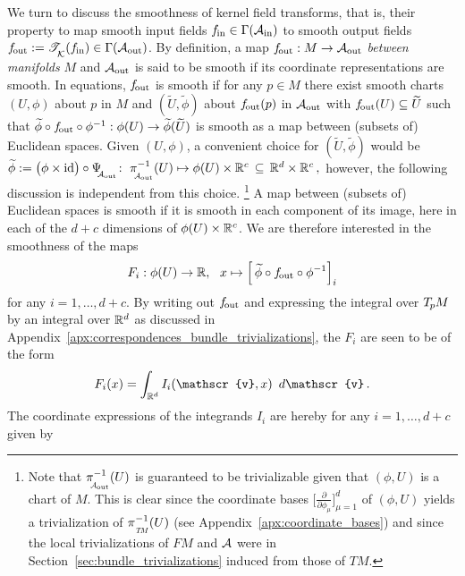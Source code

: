 We turn to discuss the smoothness of kernel field transforms, that is, their property to map smooth input fields $f_\textup{\;\!\!in}\in\Gamma(\mathcal{A}_\textup{in})$ to smooth output fields $f_\textup{\:\!\!out} := \mathscr{T}_{\overset{}{\mkern-0mu \mathcal{K}}}(f_\textup{\;\!\!in}) \in \Gamma(\mathcal{A}_\textup{out})$.
By definition, a map $f_\textup{\:\!\!out}: M\to \mathcal{A}_\textup{out}$ \emph{between manifolds} $M$ and $\mathcal{A}_\textup{out}$ is said to be smooth if its coordinate representations are smooth.
In equations, $f_\textup{\:\!\!out}$ is smooth if for any $p\in M$ there exist smooth charts $(U,\phi)$ about $p$ in $M$ and $(\widetilde{U}, \widetilde{\phi})$ about $f_\textup{\:\!\!out}(p)$ in $\mathcal{A}_\textup{out}$ with $f_\textup{\:\!\!out}(U) \subseteq \widetilde{U}$ such that $\widetilde{\phi} \circ f_\textup{\:\!\!out} \circ \phi^{-1}: \phi(U) \to \widetilde{\phi}(\widetilde{U})$ is smooth as a map between (subsets of) Euclidean spaces.
Given $(U,\phi)$, a convenient choice for $(\widetilde{U}, \widetilde{\phi})$ would be
$ \widetilde{\phi} := \big(\phi \times \id\big) \circ \PsiAout\!:\ 
  \piAout^{-1}(U) \mapsto \phi(U) \times \R^c\, \subseteq\, \R^d \times \R^c \,, $
however, the following discussion is independent from this choice.%
\footnote{
    Note that $\piAout^{-1}(U)$ is guaranteed to be trivializable given that $(\phi,U)$ is a chart of $M$.
    This is clear since the coordinate bases $\big[ \frac{\partial}{\partial \phi_\mu} \big]_{\mu=1}^d$ of $(\phi,U)$ yields a trivialization of $\piTM^{-1}(U)$ (see Appendix~\ref{apx:coordinate_bases}) and since the local trivializations of $FM$ and $\mathcal{A}$ were in Section~\ref{sec:bundle_trivializations} induced from those of $TM$.
}
A map between (subsets of) Euclidean spaces is smooth if it is smooth in each component of its image, here in each of the $d+c$ dimensions of $\phi(U)\times\mathbb{R}^c$.
We are therefore interested in the smoothness of the maps
\begin{align}
    F_i: \phi(U) \to \mathbb{R},\ \ x \mapsto \Big[\, \widetilde{\phi} \circ f_\textup{\:\!\!out} \circ \phi^{-1} \Big]_i
\end{align}
for any $i = 1,\dots,d+c$.
By writing out $f_\textup{\:\!\!out}$ and expressing the integral over $T_{\mkern-1.5mu p}\mkern-.5muM$ by an integral over $\mathbb{R}^d$ as discussed in Appendix~\ref{apx:correspondences_bundle_trivializations}, the $F_i$ are seen to be of the form
\begin{align}\label{eq:integral_smoothness_component}
    F_i(x) = \int_{\R^d} I_i(\mathscr{v},x)\,\ d\mathscr{v} \,.
\end{align}
The coordinate expressions of the integrands $I_i$ are hereby for any $i = 1,\dots,d+c$ given by
